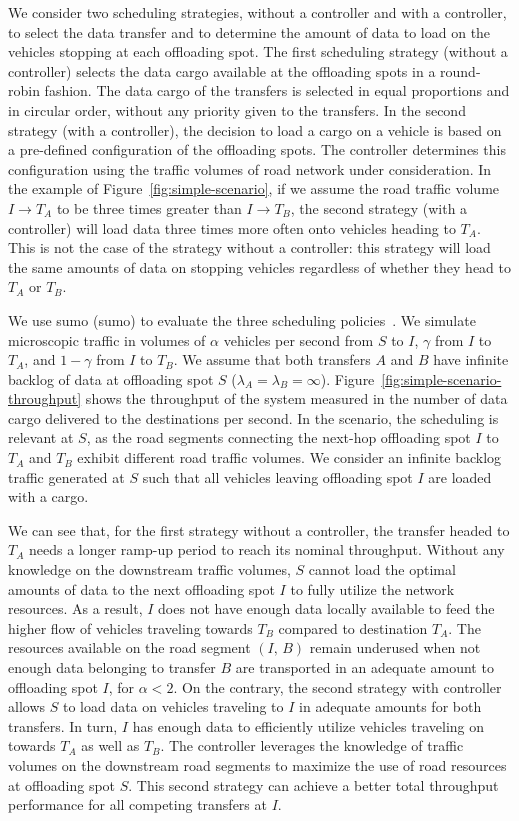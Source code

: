 We consider two scheduling strategies, without a controller and with a controller, to select the data transfer and to determine the amount of data to load on the vehicles stopping at each offloading spot. The first scheduling strategy (without a controller) selects the data cargo available at the offloading spots in a round-robin fashion. The data cargo of the transfers is selected in equal proportions and in circular order, without any priority given to the transfers. In the second strategy (with a controller), the decision to load a cargo on a vehicle is based on a pre-defined configuration of the offloading spots. The controller determines this configuration using the traffic volumes of road network under consideration. In the example of Figure~\ref{fig:simple-scenario}, if we assume the road traffic volume $I\rightarrow T_A$ to be three times greater than $I\rightarrow T_B$, the second strategy (with a controller) will load data three times more often onto vehicles heading to $T_A$. This is not the case of the strategy without a controller: this strategy will load the same amounts of data on stopping vehicles regardless of whether they head to $T_A$ or $T_B$.

We use \acrshort{sumo} (\acrlong{sumo}) to evaluate the three scheduling policies~\cite{behrisch2011sumo}. We simulate microscopic traffic in volumes of $\alpha$ vehicles per second from $S$ to $I$, $\gamma$ from $I$ to $T_A$, and $1 - \gamma$ from $I$ to $T_B$. We assume that both transfers $A$ and $B$ have infinite backlog of data at offloading spot $S$ (\ie $\lambda_A = \lambda_B = \infty$). Figure~\ref{fig:simple-scenario-throughput} shows the throughput of the system measured in the number of data cargo delivered to the destinations per second. In the scenario, the scheduling is relevant at $S$, as the road segments connecting the next-hop offloading spot $I$ to $T_A$ and $T_B$ exhibit different road traffic volumes. We consider an infinite backlog traffic generated at $S$ such that all vehicles leaving offloading spot $I$ are loaded with a cargo.

We can see that, for the first strategy without a controller, the transfer headed to $T_A$ needs a longer ramp-up period to reach its nominal throughput. Without any knowledge on the downstream traffic volumes, $S$ cannot load the optimal amounts of data to the next offloading spot $I$ to fully utilize the network resources. As a result, $I$ does not have enough data locally available to feed the higher flow of vehicles traveling towards $T_B$ compared to destination $T_A$. The resources available on the road segment $(I,\,B)$ remain underused when not enough data belonging to transfer $B$ are transported in an adequate amount to offloading spot $I$, \eg for $\alpha < 2$. On the contrary, the second strategy with controller allows $S$ to load data on vehicles traveling to $I$ in adequate amounts for both transfers. In turn, $I$ has enough data to efficiently utilize vehicles traveling on towards $T_A$ as well as $T_B$. The controller leverages the knowledge of traffic volumes on the downstream road segments to maximize the use of road resources at offloading spot $S$. This second strategy can achieve a better total throughput performance for all competing transfers at $I$. 

